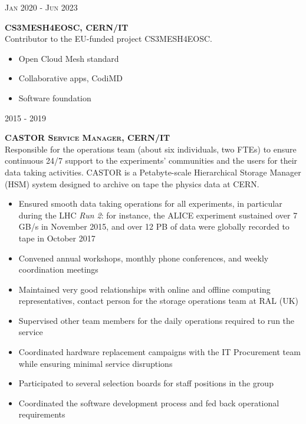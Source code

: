 \documentclass[11pt]{article}
\renewcommand{\subsection}[2]%
        {
         {\bf{\raggedright \scshape #1}}{\bf{\hfill \scshape #2}}\\[-.7\baselineskip]
}
\newenvironment{CompactItemize} {
  \begin{itemize}
  \setlength{\itemsep}{-3pt}
  \setlength{\parsep}{0pt}
  \setlength{\topsep}{-2pt}
  \setlength{\partopsep}{-2pt}
} {\end{itemize}}
\begin{document}
\subsection{Jan 2020 - Jun 2023}{CS3MESH4EOSC, CERN/IT}

Contributor to the EU-funded project CS3MESH4EOSC.

\begin{CompactItemize}
\item Open Cloud Mesh standard
\item Collaborative apps, CodiMD
\item Software foundation
\end{CompactItemize}

\subsection{2015 - 2019}{CASTOR Service Manager, CERN/IT}

Responsible for the operations team (about six individuals, two FTEs) to ensure continuous 24/7 support to the experiments' communities and the users for their data taking activities.
CASTOR is a Petabyte-scale Hierarchical Storage Manager (HSM) system designed to archive on tape the physics data at CERN.

\begin{CompactItemize}
\item Ensured smooth data taking operations for all experiments, in particular during the LHC \emph{Run 2}: for instance, the ALICE experiment sustained over 7 GB/s in November 2015, and over 12 PB of data were globally recorded to tape in October 2017
\item Convened annual workshops, monthly phone conferences, and weekly coordination meetings
\item Maintained very good relationships with online and offline computing representatives, contact person for the storage operations team at RAL (UK)
\item Supervised other team members for the daily operations required to run the service
\item Coordinated hardware replacement campaigns with the IT Procurement team while ensuring minimal service disruptions
\item Participated to several selection boards for staff positions in the group
\item Coordinated the software development process and fed back operational requirements
\end{CompactItemize}
\end{document}
